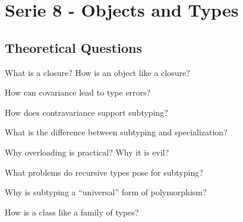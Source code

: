 \documentclass [11pt, a4wide, twoside]{article}
\begin{document}
\section*{
    \xspace{}Serie 8 - Objects and Types}

\subsection{Theoretical Questions}

\begin{myenumerate}

\item What is a closure? How is an object like a closure?

\solution{}

\item How can covariance lead to type errors?


\item How does contravariance support subtyping?



\item What is the difference between subtyping and specialization?

\solution{}


\item Why overloading is practical? Why it is evil?

\solution{}



\item What problems do recursive types pose for subtyping?

\solution{}


\item Why is subtyping a ``universal'' form of polymorphism?

\solution{}


\item How is a class like a family of types? 

\solution{}

\end{myenumerate}
\end{document}
